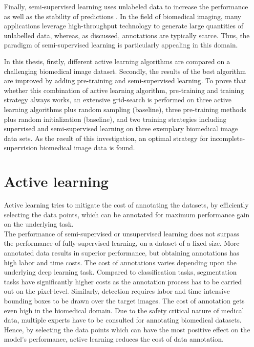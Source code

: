 Finally, semi-supervised learning uses unlabeled data to increase the performance as well as the stability of predictions \cite{sohn2020, tarvainen2017}. In the field of biomedical imaging, many applications leverage high-throughput technology \cite{blasi2016} to generate large quantities of unlabelled data, whereas, as discussed, annotations are typically scarce. Thus, the paradigm of semi-supervised learning is particularly appealing in this domain.

In this thesis, firstly, different active learning algorithms are compared on a challenging biomedical image dataset. Secondly, the results of the best algorithm are improved by adding pre-training and semi-supervised learning. To prove that whether this combination of active learning algorithm, pre-training and training strategy always works, an extensive grid-search is performed on three active learning algorithms plus random sampling (baseline), three pre-training methods plus random initialization (baseline), and two training strategies including supervised and semi-supervised learning on three exemplary biomedical image data sets. As the result of this investigation, an optimal strategy for incomplete-supervision biomedical image data is found.

\section{Active learning}
Active learning\cite{settles2009} tries to mitigate the cost of annotating the datasets, by efficiently selecting the data points, which can be annotated for maximum performance gain on the underlying task. \\
The performance of semi-supervised or unsupervised learning does not surpass the performance of fully-supervised learning, on a dataset of a fixed size. More annotated data results in superior performance, but obtaining annotations has high labor and time costs. The cost of annotations varies depending upon the underlying deep learning task. Compared to classification tasks, segmentation tasks have significantly higher costs as the annotation process has to be carried out on the pixel-level. Similarly, detection requires labor and time intensive bounding boxes to be drawn over the target images. The cost of annotation gets even high in the biomedical domain. Due to the safety critical nature of medical data, multiple experts have to be consulted for annotating biomedical datasets. \\
Hence, by selecting the data points which can have the most positive effect on the model's performance, active learning reduces the cost of data annotation.


